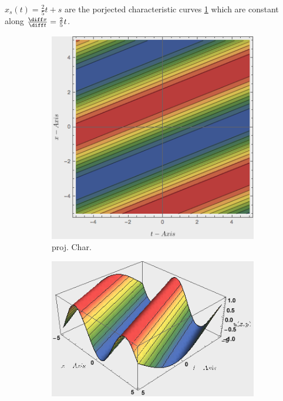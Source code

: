 \begin{notebox}[Note]
    $x_s(t)=\frac{2}{5}t+s$ are the porjected characteristic curves \cref{fig:projChar1p1} which are constant along $\frac{\diff x}{\diff t}=\frac{2}{5}t$.
                \begin{figure}[H]
                    \centering
                    \begin{subfigure}{.4\columnwidth}
                      \centering
                      \includegraphics[width=\linewidth]{src/method_of_characteristics/figures/projChar1p1.png}
                      \caption{proj. Char.}
                      \label{fig:projChar1p1}
                    \end{subfigure}%
                    \begin{subfigure}{.6\columnwidth}
                      \centering\tabularnewline
                      \includegraphics[width=\linewidth]{src/method_of_characteristics/figures/projChar1p2.png}

\end{subfigure}
\end{figure}
\end{notebox}
